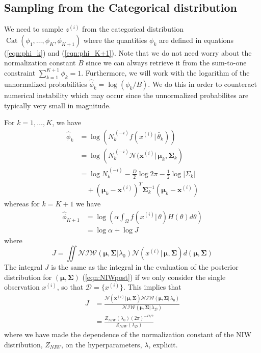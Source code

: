 \documentclass[final,3p,times,twocolumn]{elsarticle}
\DeclareMathOperator*{\Cat}{Cat}
\let\bs\boldsymbol
\begin{document}
\subsection{Sampling from the Categorical distribution}
We need to sample $z^{(i)}$ from the categorical distribution $\Cat(\phi_1,\dots,\phi_K,\phi_{K+1})$ where the quantities $\phi_k$ are defined in equations (\ref{eqn:phi_k}) and (\ref{eqn:phi_K+1}).
Note that we do not need worry about the normalization constant $B$ since we can always retrieve it from the sum-to-one constraint $\sum_{k=1}^{K+1}\phi_k=1$.
Furthermore, we will work with the logarithm of the unnormalized probabilities $\hat\phi_k = \log(\phi_k/B)$.
We do this in order to counteract numerical instability which may occur since the unnormalized probabilites are typically very small in magnitude. 

For $k=1,\dots,K$, we have
\begin{equation}
\begin{split}
\hat\phi_k &= \log\left(N^{\,(-i)}_k f(x^{(i)}|\,\bar\theta_k)\right)\\
&= \log\left(N^{\,(-i)}_k \mathcal{N}(\bs x^{(i)}|\,\bs\mu_k,\bs\Sigma_k\right)\\
&= \log N^{\,(-i)}_k -\frac{D}{2}\log2\pi -\frac{1}{2}\log|\Sigma_k|\\
&\quad+ (\bs\mu_k-\bs x^{(i)})^T\bs\Sigma_k^{-1}(\bs\mu_k-\bs x^{(i)})
\end{split}
\end{equation}
whereas for $k=K+1$ we have
\begin{equation}
\begin{split}
\hat\phi_{K+1} &= \log\left(\alpha\int_\Omega f(x^{(i)}|\,\theta)H(\theta)d\theta\right)\\
&=\log\alpha+\log J
\end{split}
\end{equation}
where
\begin{equation}
J = \iint\mathcal{NIW}(\bs\mu,\bs\Sigma|\lambda_0)\mathcal{N}(x^{(i)}|\,\bs\mu,\bs\Sigma)d(\bs\mu,\bs\Sigma)
\end{equation}
The integral $J$ is the same as the integral in the evaluation of the posterior distribution for $(\bs\mu,\bs\Sigma)$ (\ref{eqn:NIWpost}) if we only consider the single observation $x^{(i)}$, so that $\mathcal{D}=\{x^{(i)}\}$.
This implies that
\begin{equation}
\begin{split}
J &= \frac{\mathcal{N}(\bs x^{(i)}|\,\bs\mu,\bs\Sigma)\mathcal{NIW}(\bs\mu,\bs\Sigma|\,\lambda_0)}{\mathcal{NIW}(\bs\mu,\bs\Sigma|\,\lambda_\mathcal{D})}\\
&= \frac{Z_{NIW}(\lambda_0) (2\pi)^{-D/2}}{Z_{NIW}(\lambda_\mathcal{D})}
\end{split}
\end{equation}
where we have made the dependence of the normalization constant of the NIW distribution, $Z_{NIW}$, on the hyperparameters, $\lambda$, explicit.
\end{document}
